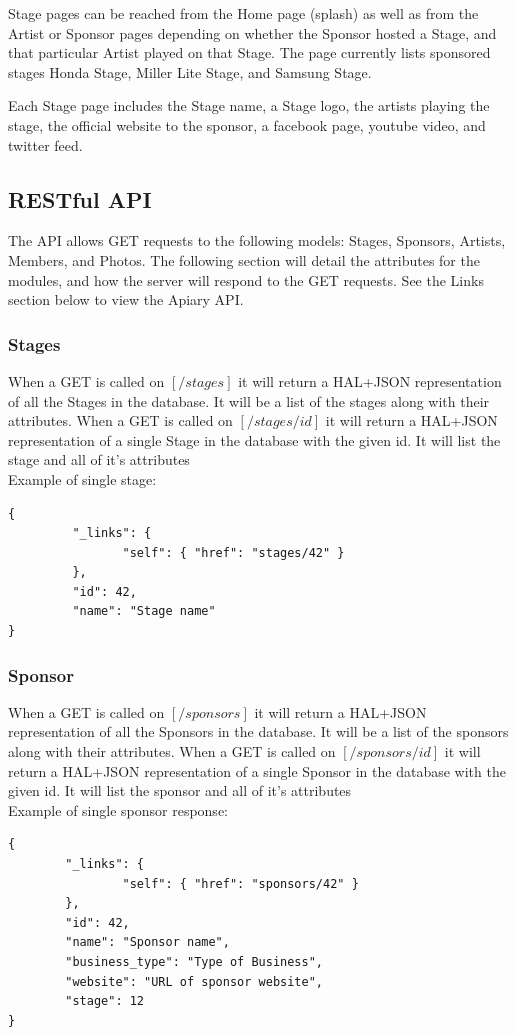 \documentclass[12pt,english]{scrartcl}
\begin{document}
Stage pages can be reached from the Home page (splash) as well as from the Artist or Sponsor pages depending on whether the Sponsor hosted a
Stage, and that particular Artist played on that Stage. The page currently lists sponsored stages Honda Stage, Miller Lite Stage, and Samsung Stage.

Each Stage page includes the Stage name, a Stage logo, the artists playing the stage, the official website to the sponsor,
a facebook page, youtube video, and twitter feed.

\subsection{RESTful  API}
The API allows GET requests to the following models: Stages, Sponsors, Artists, Members, and  Photos.
The following section will detail the attributes for the modules, and how the server will respond to the GET requests. See 
the Links section below to view the Apiary API.

\subsubsection{Stages}
When a GET is called on $[/stages]$ it will return a HAL+JSON representation of all the Stages in the database.  It will be a list of the stages along with their attributes.
When a GET is called on $[/stages/{id}]$ it will return a HAL+JSON representation of a single Stage in the database with the given id.  It will list the stage and all of it's attributes
\\
Example of single stage:
\begin{verbatim}
{
         "_links": {
                "self": { "href": "stages/42" }
         },
         "id": 42,
         "name": "Stage name"
}
\end{verbatim}
\subsubsection{Sponsor}
When a GET is called on $[/sponsors]$ it will return a HAL+JSON representation of all the Sponsors in the database.  It will be a list of the sponsors along with their attributes.
When a GET is called on $[/sponsors/{id}]$ it will return a HAL+JSON representation of a single Sponsor in the database with the given id.  It will list the sponsor and all of it's attributes
\\
Example of single sponsor response:
\begin{verbatim}
{
        "_links": {
                "self": { "href": "sponsors/42" }
        },
        "id": 42,
        "name": "Sponsor name",
        "business_type": "Type of Business",
        "website": "URL of sponsor website",
        "stage": 12
}
\end{verbatim}
\end{document}
